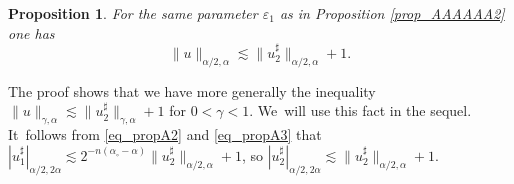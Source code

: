 \documentclass[10pt]{amsart}
\newtheorem{prop}[thm]{Proposition}
\theoremstyle{definition}
\let\epsilon\varepsilon
\begin{document}
\begin{prop} \label{prop_AAAAAA3}
For the same parameter $\epsilon_1$ as in Proposition \ref{prop_AAAAAA2} one has
\begin{equation} \label{eq_propA3}
\| u \|_{\alpha / 2, \alpha} \lesssim \| u_2^{\sharp} \|_{\alpha / 2, \alpha} + 1.
\end{equation}
\end{prop}

The proof shows that we have more generally the inequality $\| u \|_{\gamma, \alpha} \lesssim \| u_2^{\sharp} \|_{\gamma, \alpha} + 1$ for $0 < \gamma < 1$. We~will use this fact in the sequel. It~follows from \eqref{eq_propA2} and \eqref{eq_propA3} that $| u_1^{\sharp} |_{\alpha / 2, 2 \alpha} {\lesssim 2^{- n (\alpha_{\circ} - \alpha)}} \| u_2^{\sharp} \|_{\alpha / 2, \alpha} + 1$, so $| u_2^{\sharp} |_{\alpha / 2, 2 \alpha} \lesssim \| u_2^{\sharp} \|_{\alpha / 2, \alpha} + 1$.
\end{document}
